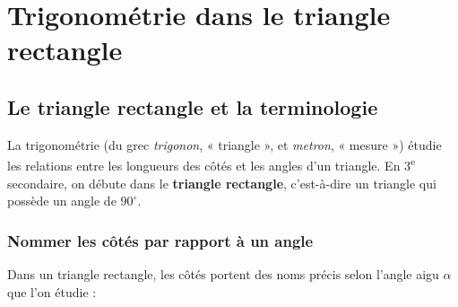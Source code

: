 \documentclass[../main.tex]{subfiles}
\begin{document}
\ifSubfilesClassLoaded{\PageLegaleChapitre}{}

\chapter{Trigonométrie dans le triangle rectangle}
\label{chap:trigonometrie}

\section{Le triangle rectangle et la terminologie}

La trigonométrie (du grec \textit{trigonon}, « triangle », et \textit{metron}, « mesure ») étudie les relations entre les longueurs des côtés et les angles d'un triangle. En 3\textsuperscript{e} secondaire, on débute dans le \textbf{triangle rectangle}, c'est-à-dire un triangle qui possède un angle de $90^\circ$.

\subsection{Nommer les côtés par rapport à un angle}

Dans un triangle rectangle, les côtés portent des noms précis selon l'angle aigu $\alpha$ que l'on étudie :

\begin{center}
\end{center}
\end{document}
